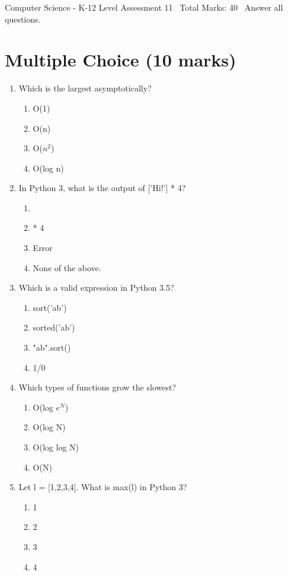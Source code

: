 \documentclass[12pt]{article}
\begin{document}
\begin{center}
Computer Science - K-12 Level Assessment 11 \
Total Marks: 40 \
Answer all questions.
\end{center}

\section*{Multiple Choice (10 marks)}
\begin{enumerate}[label=\arabic*.]
\item Which is the largest asymptotically?
\begin{enumerate}[label=(\alph*)]
    \item O(1)
    \item O(n)
    \item O($n^2$)
    \item O(log n)
\end{enumerate}
\item In Python 3, what is the output of ['Hi!'] * 4?
\begin{enumerate}[label=(\alph*)]
    \item ['Hi!', 'Hi!', 'Hi!', 'Hi!']
    \item ['Hi!'] * 4
    \item Error
    \item None of the above.
\end{enumerate}
\item Which is a valid expression in Python 3.5?
\begin{enumerate}[label=(\alph*)]
    \item sort('ab')
    \item sorted('ab')
    \item "ab".sort()
    \item 1/0
\end{enumerate}
\item Which types of functions grow the slowest?
\begin{enumerate}[label=(\alph*)]
    \item O(log $e^N$)
    \item O(log N)
    \item O(log log N)
    \item O(N)
\end{enumerate}
\item Let l = [1,2,3,4]. What is max(l) in Python 3?
\begin{enumerate}[label=(\alph*)]
    \item 1
    \item 2
    \item 3
    \item 4
\end{enumerate}
\end{enumerate}
\end{document}

